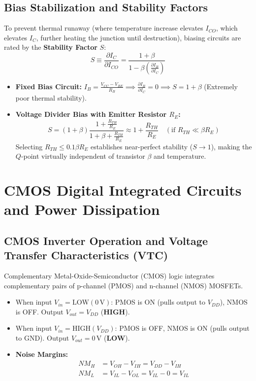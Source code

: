 \subsection{Bias Stabilization and Stability Factors}
To prevent thermal runaway (where temperature increase elevates $I_{CO}$, which elevates $I_C$, further heating the junction until destruction), biasing circuits are rated by the \textbf{Stability Factor} $S$:
\begin{equation}
    S \equiv \frac{\partial I_C}{\partial I_{CO}} = \frac{1 + \beta}{1 - \beta \left(\frac{\partial I_B}{\partial I_C}\right)}
\end{equation}
\begin{itemize}
    \item \textbf{Fixed Bias Circuit:} $I_B = \frac{V_{CC} - V_{BE}}{R_B} \implies \frac{\partial I_B}{\partial I_C} = 0 \implies S = 1 + \beta$ (Extremely poor thermal stability).
    \item \textbf{Voltage Divider Bias with Emitter Resistor $R_E$:}
    \begin{equation}
        S = (1 + \beta) \frac{1 + \frac{R_{TH}}{R_E}}{1 + \beta + \frac{R_{TH}}{R_E}} \approx 1 + \frac{R_{TH}}{R_E} \quad (\text{if } R_{TH} \ll \beta R_E)
    \end{equation}
    Selecting $R_{TH} \le 0.1 \beta R_E$ establishes near-perfect stability ($S \to 1$), making the $Q$-point virtually independent of transistor $\beta$ and temperature.
\end{itemize}

\section{CMOS Digital Integrated Circuits and Power Dissipation}
\subsection{CMOS Inverter Operation and Voltage Transfer Characteristics (VTC)}
Complementary Metal-Oxide-Semiconductor (CMOS) logic integrates complementary pairs of p-channel (PMOS) and n-channel (NMOS) MOSFETs.
\begin{itemize}
    \item When input $V_{in} = \text{LOW} (0\,\text{V})$: PMOS is ON (pulls output to $V_{DD}$), NMOS is OFF. Output $V_{out} = V_{DD}$ (\textbf{HIGH}).
    \item When input $V_{in} = \text{HIGH} (V_{DD})$: PMOS is OFF, NMOS is ON (pulls output to $\text{GND}$). Output $V_{out} = 0\,\text{V}$ (\textbf{LOW}).
    \item \textbf{Noise Margins:}
    \begin{align}
        NM_H &= V_{OH} - V_{IH} = V_{DD} - V_{IH} \\
        NM_L &= V_{IL} - V_{OL} = V_{IL} - 0 = V_{IL}
    \end{align}
\end{itemize}

